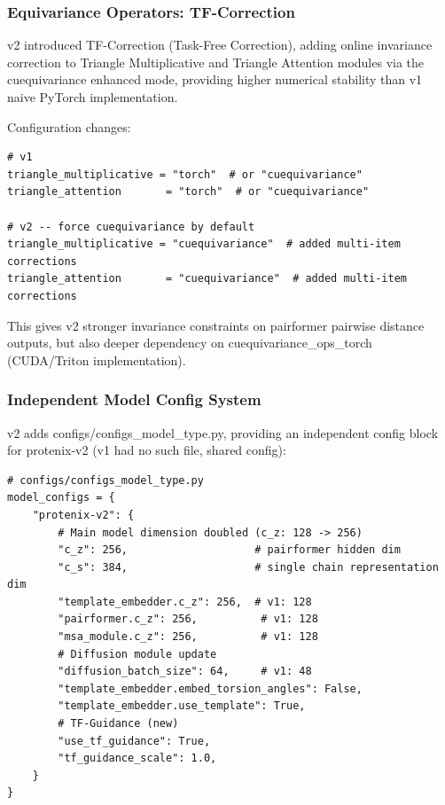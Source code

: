 \documentclass[12pt,a4paper]{article}
\begin{document}
\subsubsection{Equivariance Operators: TF-Correction}

v2 introduced TF-Correction (Task-Free Correction), adding online invariance correction to Triangle Multiplicative and Triangle Attention modules via the cuequivariance enhanced mode, providing higher numerical stability than v1 naive PyTorch implementation.

Configuration changes:
\begin{verbatim}
# v1
triangle_multiplicative = "torch"  # or "cuequivariance"
triangle_attention       = "torch"  # or "cuequivariance"

# v2 -- force cuequivariance by default
triangle_multiplicative = "cuequivariance"  # added multi-item corrections
triangle_attention       = "cuequivariance"  # added multi-item corrections
\end{verbatim}

This gives v2 stronger invariance constraints on pairformer pairwise distance outputs, but also deeper dependency on cuequivariance_ops_torch (CUDA/Triton implementation).

\subsubsection{Independent Model Config System}

v2 adds configs/configs_model_type.py, providing an independent config block for protenix-v2 (v1 had no such file, shared config):

\begin{verbatim}
# configs/configs_model_type.py
model_configs = {
    "protenix-v2": {
        # Main model dimension doubled (c_z: 128 -> 256)
        "c_z": 256,                    # pairformer hidden dim
        "c_s": 384,                    # single chain representation dim
        "template_embedder.c_z": 256,  # v1: 128
        "pairformer.c_z": 256,          # v1: 128
        "msa_module.c_z": 256,          # v1: 128
        # Diffusion module update
        "diffusion_batch_size": 64,     # v1: 48
        "template_embedder.embed_torsion_angles": False,
        "template_embedder.use_template": True,
        # TF-Guidance (new)
        "use_tf_guidance": True,
        "tf_guidance_scale": 1.0,
    }
}
\end{verbatim}
\end{document}
